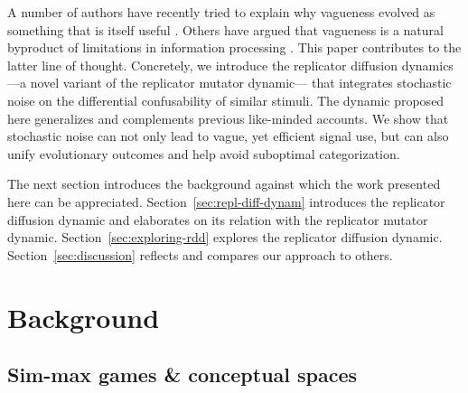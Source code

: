 \documentclass[fleqn,reqno,10pt]{article}
\begin{document}
A number of authors have recently tried to explain why vagueness
evolved as something that is itself useful
\citep[e.g.][]{Jaegherde-Jaegher2003:A-Game-Theoreti,Deemter2009:Utility-and-Lan,BlumeBoard2013:Intentional-Vag}.
Others have argued that vagueness is a natural byproduct of
limitations in information processing
\citep[e.g.][]{FrankeJager2010:Vagueness-Signa,OConnor2013:The-Evolution-o}. This
paper contributes to the latter line of thought. Concretely, we
introduce the replicator diffusion dynamics ---a novel variant of the
replicator mutator dynamic--- that integrates stochastic noise on the
differential confusability of similar stimuli. The dynamic proposed
here generalizes and complements previous like-minded accounts. We
show that stochastic noise can not only lead to vague, yet efficient
signal use, but can also unify evolutionary outcomes and help avoid
suboptimal categorization.

The next section introduces the background against which the work
presented here can be appreciated. Section~\ref{sec:repl-diff-dynam}
introduces the replicator diffusion dynamic and elaborates on its
relation with the replicator mutator
dynamic. Section~\ref{sec:exploring-rdd} explores the replicator
diffusion dynamic. Section~\ref{sec:discussion} reflects and compares
our approach to others.

\section{Background}
\label{sec:background}


\subsection{Sim-max games \& conceptual spaces}
\end{document}
